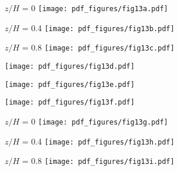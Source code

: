 \documentclass{jfm}
\begin{document}
\begin{figure}
\centering

\begin{subfigure}{.32\textwidth}
  \centering
  $z/H$ = 0
  \texttt{[image: pdf\_figures/fig13a.pdf]}
  \caption{}
  \label{fig:3_6mm_20p_Re27000_sp00mm_Umean}
\end{subfigure}%
\begin{subfigure}{.32\textwidth}
  \centering
  $z/H$ = 0.4
  \texttt{[image: pdf\_figures/fig13b.pdf]}
  \caption{}
  \label{fig:3_6mm_20p_Re27000_sp10mm_Umean}
\end{subfigure}
\begin{subfigure}{.32\textwidth}
  \centering
  $z/H$ = 0.8
  \texttt{[image: pdf\_figures/fig13c.pdf]}
  \caption{}
  \label{fig:3_6mm_20p_Re27000_sp20mm_Umean}
\end{subfigure}

\begin{subfigure}{.32\textwidth}
  \centering
  \texttt{[image: pdf\_figures/fig13d.pdf]}
  \caption{}
  \label{fig:3_6mm_20p_Re27000_sp00mm_phi}
\end{subfigure}%
\begin{subfigure}{.32\textwidth}
  \centering
  \texttt{[image: pdf\_figures/fig13e.pdf]}
  \caption{}
  \label{fig:3_6mm_30p_Re27000_sp10mm_phi}
\end{subfigure}
\begin{subfigure}{.32\textwidth}
  \centering
  \texttt{[image: pdf\_figures/fig13f.pdf]}
  \caption{}
  \label{fig:3_6mm_20p_Re27000_sp20mm_phi}
\end{subfigure}

\begin{subfigure}{.32\textwidth}
  \centering
  $z/H$ = 0
  \texttt{[image: pdf\_figures/fig13g.pdf]}
  \caption{}
  \label{fig:3_6mm_20p_Re27000_sp00mm_Rep}
\end{subfigure}%
\begin{subfigure}{.32\textwidth}
  \centering
  $z/H$ = 0.4
  \texttt{[image: pdf\_figures/fig13h.pdf]}
  \caption{}
  \label{fig:3_6mm_20p_Re27000_sp10mm_Rep}
\end{subfigure}
\begin{subfigure}{.32\textwidth}
  \centering
  $z/H$ = 0.8
  \texttt{[image: pdf\_figures/fig13i.pdf]}
  \caption{}
  \label{fig:3_6mm_20p_Re27000_sp20mm_Rep}
\end{subfigure}


\end{figure}
\end{document}
